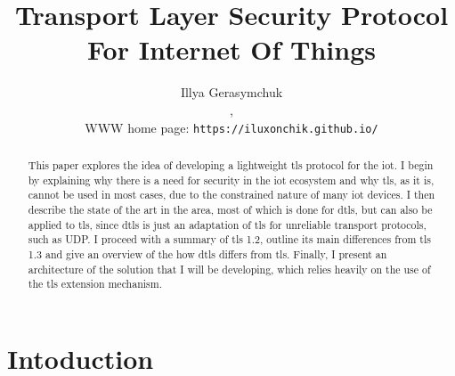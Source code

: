 \documentclass{llncs}
\begin{document}
%
\frontmatter          %
%
\pagestyle{headings}  %
%

\tableofcontents
\newpage

\mainmatter              %
%
\title{Transport Layer Security Protocol For Internet Of Things}
%
%
\author{{Illya Gerasymchuk} \\
,\\ WWW home page:
\texttt{https://iluxonchik.github.io/}}
%
%
%
\maketitle              %

\begin{abstract}
This paper explores the idea of developing a lightweight \gls{tls} protocol
for the \gls{iot}. I begin by explaining why there is a need for security in
the \gls{iot} ecosystem and why \gls{tls}, as it is, cannot be used in most cases,
due to the constrained nature of many \gls{iot} devices. I then describe the state
of the art in the area, most of which is done for \gls{dtls}, but can
also be applied to \gls{tls}, since \gls{dtls} is just an adaptation of
\gls{tls} for unreliable transport protocols, such as UDP. I proceed with a
summary of \gls{tls} 1.2, outline its main differences from \gls{tls} 1.3
and give an overview of the how \gls{dtls} differs from \gls{tls}. Finally, I present
an architecture of the solution that I will be developing, which relies
heavily on the use of the \gls{tls} extension mechanism.

\end{abstract}
%
\section{Intoduction}
%
\end{document}
